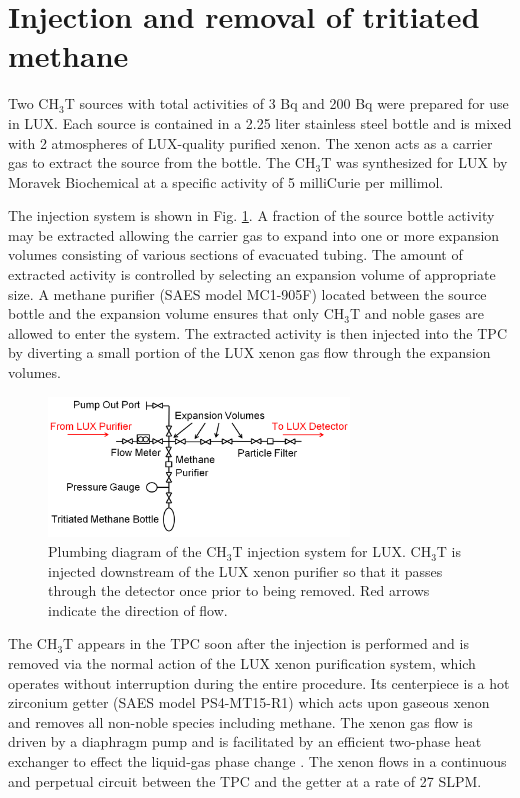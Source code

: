 \section{Injection and removal of tritiated methane}

Two CH$_3$T sources with total activities of 3 Bq and 200 Bq were prepared for use in LUX. Each source is contained in a 2.25 liter stainless steel bottle and is mixed with 2 atmospheres of LUX-quality purified xenon. The xenon acts as a carrier gas to extract the source from the bottle. The CH$_3$T was synthesized for LUX by Moravek Biochemical \cite{moravek} at a specific activity of 5 milliCurie per millimol.

The injection system is shown in Fig. \ref{fig:plumbing}. A fraction of the source bottle activity may be extracted allowing the carrier gas to expand into one or more expansion volumes consisting of various sections of evacuated tubing. The amount of extracted activity is controlled by selecting an expansion volume of appropriate size. A methane purifier (SAES model MC1-905F) located between the source bottle and the expansion volume ensures that only CH$_3$T and noble gases are allowed to enter the system. The extracted activity is then injected into the TPC by diverting a small portion of the LUX xenon gas flow through the expansion volumes. 

\begin{figure}[H]\centering
\includegraphics[width=80mm]{TritiumPlumbing.png}
\caption{Plumbing diagram of the CH$_3$T injection system for LUX. CH$_3$T is injected downstream of the LUX xenon purifier so that it passes through the detector once prior to being removed.  Red arrows indicate the direction of flow.}
\label{fig:plumbing}
\end{figure}

The CH$_3$T appears in the TPC soon after the injection is performed and is removed via the normal action of the LUX xenon purification system, which operates without interruption during the entire procedure. Its centerpiece is a hot zirconium getter (SAES model PS4-MT15-R1) which acts upon gaseous xenon and removes all non-noble species including methane. The xenon gas flow is driven by a diaphragm pump and is facilitated by an efficient two-phase heat exchanger to effect the liquid-gas phase change \cite{two phase_hx}. The xenon flows in a continuous and perpetual circuit between the TPC and the getter at a rate of 27 SLPM. 

